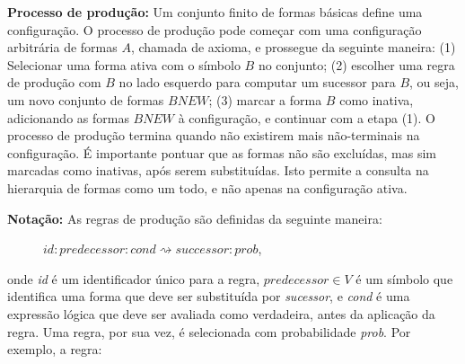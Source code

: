 \begin{figure}[h!]
	\centering
	\captionsetup{width=15cm}
	{}	
\end{figure}

\textbf{Processo de produção:} Um conjunto finito de formas básicas define uma configuração. O processo de produção pode começar com uma configuração arbitrária de formas $A$, chamada de axioma, e prossegue da seguinte maneira: (1) Selecionar uma forma ativa com o símbolo $B$ no conjunto; (2) escolher uma regra de produção com $B$ no lado esquerdo para computar um sucessor para $B$, ou seja, um novo conjunto de formas $BNEW$; (3) marcar a forma $B$ como inativa, adicionando as formas $BNEW$ à configuração, e continuar com a etapa (1). O processo de produção termina quando não existirem mais não-terminais na configuração. É importante pontuar que as formas não são excluídas, mas sim marcadas como inativas, após serem substituídas. Isto permite a consulta na hierarquia de formas como um todo, e não apenas na configuração ativa.

\textbf{Notação:} As regras de produção são definidas da seguinte maneira:

\vspace{0.3cm}

\begin{description}
    \item[] \qquad \qquad $id: predecessor : cond \rightsquigarrow successor : prob$,
\end{description}

\vspace{0.3cm}

\noindent onde \textit{id} é um identificador único para a regra, $predecessor \in V$ é um símbolo que identifica uma forma que deve ser substituída por \textit{sucessor}, e \textit{cond} é uma expressão lógica que deve ser avaliada como verdadeira, antes da aplicação da regra. Uma regra, por sua vez, é selecionada com probabilidade \textit{prob}. Por exemplo, a regra:

